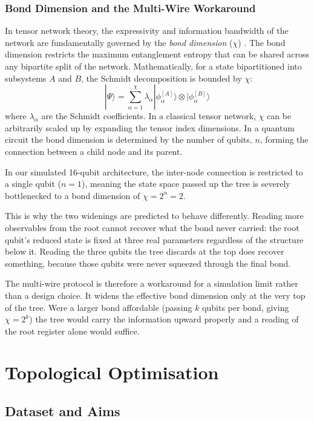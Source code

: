 \documentclass[12pt, a4paper, oneside]{report}
\begin{document}
\subsection{Bond Dimension and the Multi-Wire Workaround}
In tensor network theory, the expressivity and information bandwidth of the network are fundamentally governed by the \textit{bond dimension} ($\chi$) \cite{schollwock2011}. The bond dimension restricts the maximum entanglement entropy that can be shared across any bipartite split of the network. Mathematically, for a state bipartitioned into subsystems $A$ and $B$, the Schmidt decomposition is bounded by $\chi$:
\begin{equation}
    |\Psi\rangle = \sum_{\alpha=1}^{\chi} \lambda_\alpha |\phi_\alpha^{[A]}\rangle \otimes |\phi_\alpha^{[B]}\rangle
\end{equation}
where $\lambda_\alpha$ are the Schmidt coefficients. In a classical tensor network, $\chi$ can be arbitrarily scaled up by expanding the tensor index dimensions. In a quantum circuit the bond dimension is determined by the number of qubits, $n$, forming the connection between a child node and its parent.

In our simulated 16-qubit architecture, the inter-node connection is restricted to a single qubit ($n=1$), meaning the state space passed up the tree is severely bottlenecked to a bond dimension of $\chi = 2^n =2$.

This is why the two widenings are predicted to behave differently. Reading more observables from the root cannot recover what the bond never carried: the root qubit's reduced state is fixed at three real parameters regardless of the structure below it. Reading the three qubits the tree discards at the top does recover something, because those qubits were never squeezed through the final bond.

The multi-wire protocol is therefore a workaround for a simulation limit rather than a design choice. It widens the effective bond dimension only at the very top of the tree. Were a larger bond affordable (passing $k$ qubits per bond, giving $\chi = 2^k$) the tree would carry the information upward properly and a reading of the root register alone would suffice.


\chapter{Topological Optimisation}
\label{ch:synthetic}

\section{Dataset and Aims}
\end{document}

